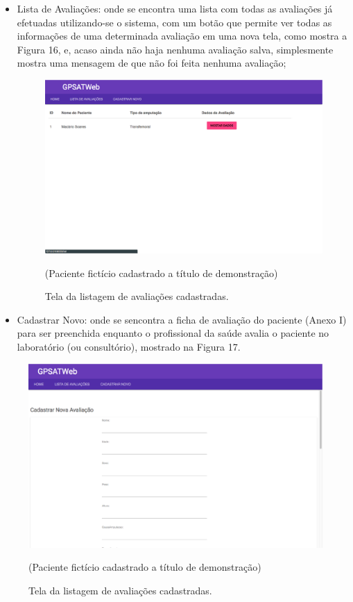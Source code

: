 	\begin{itemize}
		\item Lista de Avaliações: onde se encontra uma lista com todas as avaliações já efetuadas utilizando-se o sistema, com um botão que permite ver todas as informações de uma determinada avaliação em uma nova tela, como mostra a Figura 16, e, acaso ainda não haja nenhuma avaliação salva, simplesmente mostra uma mensagem de que não foi feita nenhuma avaliação;

		\begin{figure}[ht]
		    \centering
		    \label{fig16}
		        \includegraphics[keepaspectratio=true, scale=0.23]{editaveis/images/tela_lista.eps}
		    \caption{Tela da listagem de avaliações cadastradas.}
		    (Paciente fictício cadastrado a título de demonstração)
		\end{figure} 


		\item Cadastrar Novo: onde se sencontra a ficha de avaliação do paciente (Anexo I) para ser preenchida enquanto o profissional da saúde avalia o paciente no laboratório (ou consultório), mostrado na Figura 17.
	\end{itemize}

	\begin{figure}[ht]
	    \centering
	    \label{fig17}
	        \includegraphics[keepaspectratio=true, scale=0.23]{editaveis/images/tela_cadastro.eps}
	    \caption{Tela da listagem de avaliações cadastradas.}
	    (Paciente fictício cadastrado a título de demonstração)
	\end{figure} 

